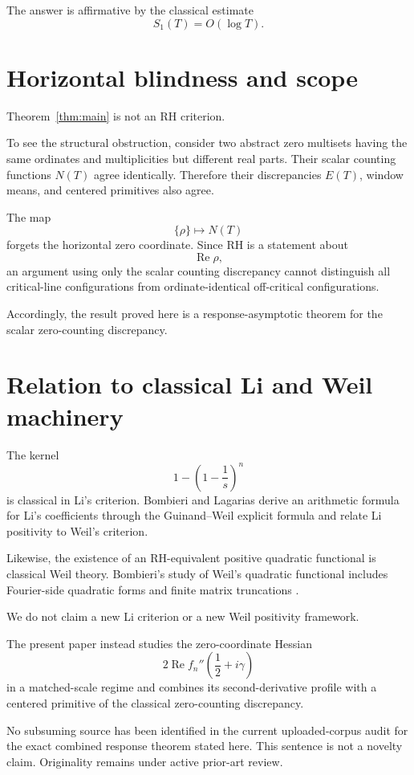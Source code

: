 \documentclass[11pt]{article}
\begin{document}
The answer is affirmative by the classical estimate
\[
S_1(T)=O(\log T).
\]

\section{Horizontal blindness and scope}

Theorem~\ref{thm:main} is not an RH criterion.

To see the structural obstruction, consider two abstract zero
multisets having the same ordinates and multiplicities but different
real parts. Their scalar counting functions \(N(T)\) agree identically.
Therefore their discrepancies \(E(T)\), window means, and centered
primitives also agree.

The map
\[
\{\rho\}
\longmapsto
N(T)
\]
forgets the horizontal zero coordinate. Since RH is a statement about
\[
\operatorname{Re}\rho,
\]
an argument using only the scalar counting discrepancy cannot
distinguish all critical-line configurations from
ordinate-identical off-critical configurations.

Accordingly, the result proved here is a response-asymptotic theorem
for the scalar zero-counting discrepancy.

\section{Relation to classical Li and Weil machinery}

The kernel
\[
1-\left(1-\frac1s\right)^n
\]
is classical in Li's criterion. Bombieri and Lagarias
\cite{BombieriLagarias1999} derive an arithmetic formula for Li's
coefficients through the Guinand--Weil explicit formula and relate
Li positivity to Weil's criterion.

Likewise, the existence of an RH-equivalent positive quadratic
functional is classical Weil theory. Bombieri's study of Weil's
quadratic functional includes Fourier-side quadratic forms and finite
matrix truncations \cite{Bombieri2000}.

We do not claim a new Li criterion or a new Weil positivity framework.

The present paper instead studies the zero-coordinate Hessian
\[
2\operatorname{Re}
f_n''
\left(
\frac12+i\gamma
\right)
\]
in a matched-scale regime and combines its second-derivative profile
with a centered primitive of the classical zero-counting discrepancy.

No subsuming source has been identified in the current
uploaded-corpus audit for the exact combined response theorem stated
here. This sentence is not a novelty claim. Originality remains under active prior-art review.
\end{document}
